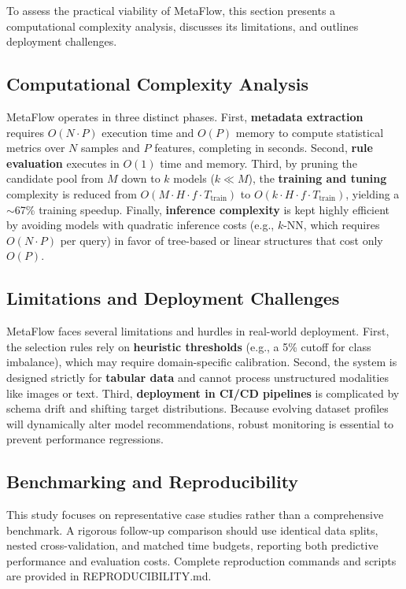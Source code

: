 \documentclass[runningheads]{llncs}
\begin{document}
To assess the practical viability of MetaFlow, this section presents a computational complexity analysis, discusses its limitations, and outlines deployment challenges.\subsection{Computational Complexity Analysis}MetaFlow operates in three distinct phases. First, \textbf{metadata extraction} requires $O(N \cdot P)$ execution time and $O(P)$ memory to compute statistical metrics over $N$ samples and $P$ features, completing in seconds. Second, \textbf{rule evaluation} executes in $O(1)$ time and memory. Third, by pruning the candidate pool from $M$ down to $k$ models ($k \ll M$), the \textbf{training and tuning} complexity is reduced from $O(M \cdot H \cdot f \cdot T_{\text{train}})$ to $O(k \cdot H \cdot f \cdot T_{\text{train}})$, yielding a $\sim$67\% training speedup. Finally, \textbf{inference complexity} is kept highly efficient by avoiding models with quadratic inference costs (e.g., $k$-NN, which requires $O(N \cdot P)$ per query) in favor of tree-based or linear structures that cost only $O(P)$.\subsection{Limitations and Deployment Challenges}MetaFlow faces several limitations and hurdles in real-world deployment. First, the selection rules rely on \textbf{heuristic thresholds} (e.g., a 5\% cutoff for class imbalance), which may require domain-specific calibration. Second, the system is designed strictly for \textbf{tabular data} and cannot process unstructured modalities like images or text. Third, \textbf{deployment in CI/CD pipelines} is complicated by schema drift and shifting target distributions. Because evolving dataset profiles will dynamically alter model recommendations, robust monitoring is essential to prevent performance regressions.\subsection{Benchmarking and Reproducibility}This study focuses on representative case studies rather than a comprehensive benchmark. A rigorous follow-up comparison should use identical data splits, nested cross-validation, and matched time budgets, reporting both predictive performance and evaluation costs. Complete reproduction commands and scripts are provided in REPRODUCIBILITY.md.

\end{document}
